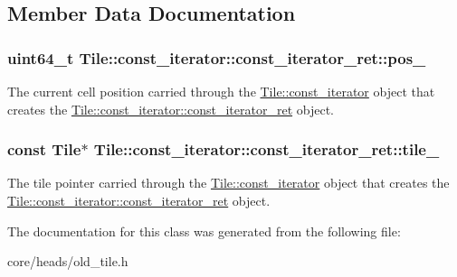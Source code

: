 \subsection{Member Data Documentation}
\hypertarget{classTile_1_1const__iterator_1_1const__iterator__ret_ac806ca3ba6b003e85b5f6ac933967aca}{}
\subsubsection[{pos\+\_\+}]{\setlength{\rightskip}{0pt plus 5cm}uint64\+\_\+t Tile\+::const\+\_\+iterator\+::const\+\_\+iterator\+\_\+ret\+::pos\+\_\+\hspace{0.3cm}{\ttfamily [private]}}\label{classTile_1_1const__iterator_1_1const__iterator__ret_ac806ca3ba6b003e85b5f6ac933967aca}
The current cell position carried through the \hyperlink{classTile_1_1const__iterator}{Tile\+::const\+\_\+iterator} object that creates the \hyperlink{classTile_1_1const__iterator_1_1const__iterator__ret}{Tile\+::const\+\_\+iterator\+::const\+\_\+iterator\+\_\+ret} object. \hypertarget{classTile_1_1const__iterator_1_1const__iterator__ret_a8afa330d88c985a9e3d5f6351e01302b}{}
\subsubsection[{tile\+\_\+}]{\setlength{\rightskip}{0pt plus 5cm}const {\bf Tile}$\ast$ Tile\+::const\+\_\+iterator\+::const\+\_\+iterator\+\_\+ret\+::tile\+\_\+\hspace{0.3cm}{\ttfamily [private]}}\label{classTile_1_1const__iterator_1_1const__iterator__ret_a8afa330d88c985a9e3d5f6351e01302b}
The tile pointer carried through the \hyperlink{classTile_1_1const__iterator}{Tile\+::const\+\_\+iterator} object that creates the \hyperlink{classTile_1_1const__iterator_1_1const__iterator__ret}{Tile\+::const\+\_\+iterator\+::const\+\_\+iterator\+\_\+ret} object. 

The documentation for this class was generated from the following file\+:\begin{DoxyCompactItemize}
\item 
core/heads/old\+\_\+tile.\+h\end{DoxyCompactItemize}

